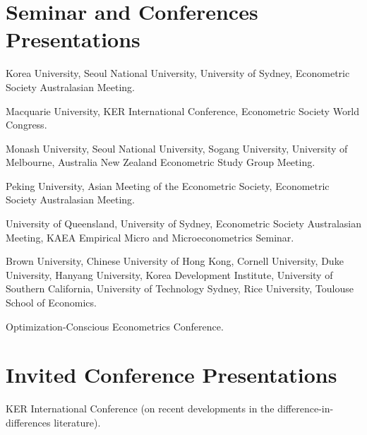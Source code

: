 \documentclass[10pt,letterpaper]{article}
\begin{document}
\section*{Seminar and Conferences Presentations}

\begin{description}[font=\mdseries]
\item[2026]
  Korea University,
  Seoul National University,
  University of Sydney,
  Econometric Society Australasian Meeting.
\item[2025]
  Macquarie University,
  KER International Conference,
  Econometric Society World Congress.
\item[2024]
  Monash University,
  Seoul National University,
  Sogang University,
  University of Melbourne,
  Australia New Zealand Econometric Study Group Meeting.
\item[2023]
  Peking University,
  Asian Meeting of the Econometric Society,
  Econometric Society Australasian Meeting.
\item[2022]
  University of Queensland,
  University of Sydney,
  Econometric Society Australasian Meeting,
  KAEA Empirical Micro and Microeconometrics Seminar.
\item[2020]
  Brown University,
  Chinese University of Hong Kong,
  Cornell University,
  Duke University,
  Hanyang University,
  Korea Development Institute,
  University of Southern California,
  University of Technology Sydney,
  Rice University,
  Toulouse School of Economics.
\item[2019]
  Optimization-Conscious Econometrics Conference.
\end{description}

\section*{Invited Conference Presentations}

\begin{description}[font=\mdseries]
\item[2024]
  KER International Conference (on recent developments in the difference-in-differences literature).
\end{description}
\end{document}
